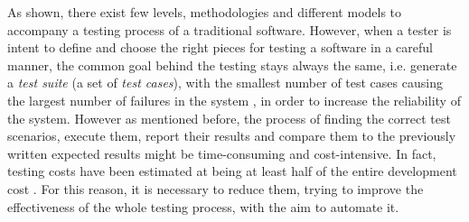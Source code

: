 As shown, there exist few levels, methodologies and different models to accompany a testing process of a traditional software. However, when a tester is intent to define and choose the right pieces for testing a software in a careful manner, the common goal behind the testing stays always the same, i.e. generate a \textit{test suite} (a set of \textit{test cases}), with the smallest number of test cases causing the largest number of failures in the system \cite{grano}, in order to increase the reliability of the system. 
However as mentioned before, the process of finding the correct test scenarios, execute them, report their results and compare them to the previously written expected results might be time-consuming and cost-intensive. In fact, testing costs have been estimated at being at least half of the entire development cost \cite{Beizer:1990:STT:79060}. For this reason, it is necessary to reduce them, trying to improve the effectiveness of the whole testing process, with the aim to automate it. \\

